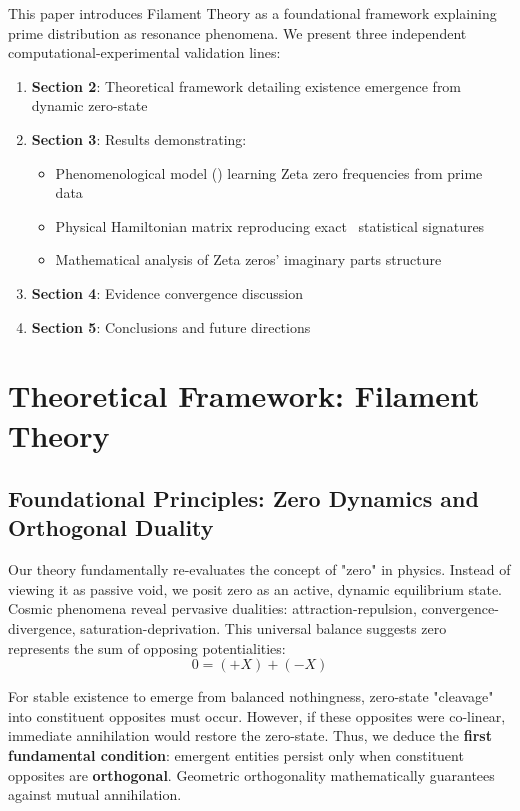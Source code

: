 \documentclass[11pt,a4paper]{article}
\newcommand{\GSE}{\text{GSE}}
\newcommand{\GUE}{\text{GUE}}
\begin{document}
This paper introduces Filament Theory as a foundational framework explaining prime distribution as resonance phenomena. We present three independent computational-experimental validation lines:

\begin{enumerate}
\item \textbf{Section 2}: Theoretical framework detailing existence emergence from dynamic zero-state
\item \textbf{Section 3}: Results demonstrating:
    \begin{itemize}
    \item Phenomenological model (\GSE) learning Zeta zero frequencies from prime data
    \item Physical Hamiltonian matrix reproducing exact \GUE\ statistical signatures
    \item Mathematical analysis of Zeta zeros' imaginary parts structure
    \end{itemize}
\item \textbf{Section 4}: Evidence convergence discussion
\item \textbf{Section 5}: Conclusions and future directions
\end{enumerate}







\section{Theoretical Framework: Filament Theory}

\subsection{Foundational Principles: Zero Dynamics and Orthogonal Duality}

Our theory fundamentally re-evaluates the concept of "zero" in physics. Instead of viewing it as passive void, we posit zero as an active, dynamic equilibrium state. Cosmic phenomena reveal pervasive dualities: attraction-repulsion, convergence-divergence, saturation-deprivation. This universal balance suggests zero represents the sum of opposing potentialities:
\begin{equation}
0 = (+X) + (-X)
\end{equation}

For stable existence to emerge from balanced nothingness, zero-state "cleavage" into constituent opposites must occur. However, if these opposites were co-linear, immediate annihilation would restore the zero-state. Thus, we deduce the \textbf{first fundamental condition}: emergent entities persist only when constituent opposites are \textbf{orthogonal}. Geometric orthogonality mathematically guarantees against mutual annihilation.
\end{document}
